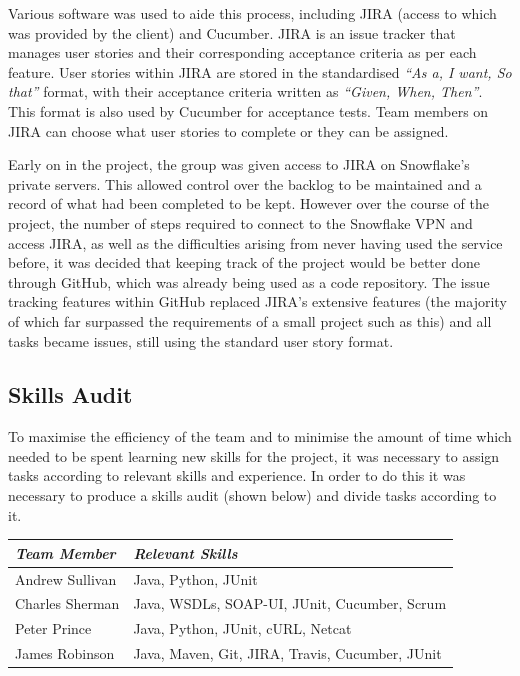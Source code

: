\documentclass[a4paper, 12pt, twoside]{article}
\begin{document}
Various software was used to aide this process, including JIRA (access to which was provided by the client) and Cucumber. JIRA is an issue tracker that manages user stories and their corresponding acceptance criteria as per each feature. User stories within JIRA are stored in the standardised \emph{``As a, I want, So that''} format, with their acceptance criteria written as \emph{``Given, When, Then''}. This format is also used by Cucumber for acceptance tests. Team members on JIRA can choose what user stories to complete or they can be assigned.

Early on in the project, the group was given access to JIRA on Snowflake's private servers. This allowed control over the backlog to be maintained and a record of what had been completed to be kept. However over the course of the project, the number of steps required to connect to the Snowflake VPN and access JIRA, as well as the difficulties arising from never having used the service before, it was decided that keeping track of the project would be better done through GitHub, which was already being used as a code repository. The issue tracking features within GitHub replaced JIRA's extensive features (the majority of which far surpassed the requirements of a small project such as this) and all tasks became issues, still using the standard user story format.

\subsection{Skills Audit}
\label{sec:plan_skills_audit}
To maximise the efficiency of the team and to minimise the amount of time which needed to be spent learning new skills for the project, it was necessary to assign tasks according to relevant skills and experience. In order to do this it was necessary to produce a skills audit (shown below) and divide tasks according to it.

\begin{table}[h]
\begin{tabular}{|l|l|}
\hline
\emph{Team Member} & \emph{Relevant Skills}                           \\ \hline
Andrew Sullivan    & Java, Python, JUnit                              \\ \hline
Charles Sherman    & Java, WSDLs, SOAP-UI, JUnit, Cucumber, Scrum     \\ \hline
Peter Prince       & Java, Python, JUnit, cURL, Netcat                \\ \hline
James Robinson     & Java, Maven, Git, JIRA, Travis, Cucumber, JUnit  \\ \hline
\end{tabular}
\end{table}
\end{document}
